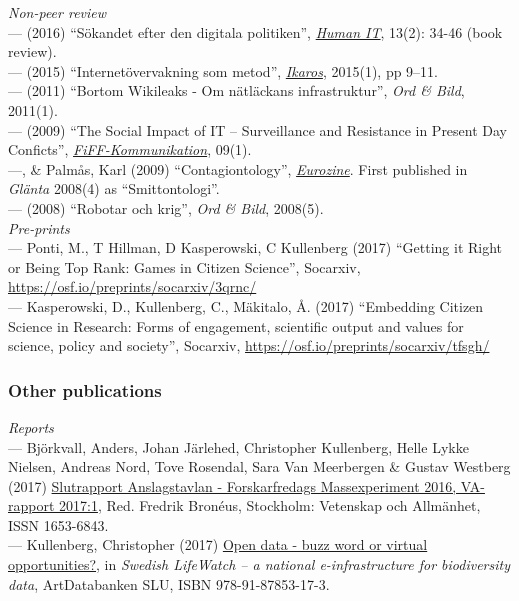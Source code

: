 \documentclass[a4paper,11pt,oneside]{article}
\begin{document}
  \noindent  \emph{Non-peer review} \\
    --- (2016) ``Sökandet efter den digitala politiken'', \href{https://humanit.hb.se/article/view/504/572}{\emph{Human IT}}, 13(2): 34-46 (book review).\\
    --- (2015) ``Internetövervakning som metod'', \href{http://gup.ub.gu.se/records/fulltext/220443/220443.pdf}{\emph{Ikaros}}, 2015(1), pp 9–11.\\
    --- (2011) ``Bortom Wikileaks - Om nätläckans infrastruktur'', \emph{Ord \& Bild}, 2011(1).\\
    --- (2009) ``The Social Impact of IT – Surveillance and Resistance in Present Day Conficts'', \href{http://www.fiff.de/publikationen/fiff-kommunikation/fk-2009/fiff-ko-1-2009/fiko_1_2009_kullenberg.pdf}{\emph{FiFF-Kommunikation}}, 09(1).\\
    ---, \& Palmås, Karl (2009) ``Contagiontology'', \href{http://www.eurozine.com/articles/2009-03-09-kullenberg-en.html}{\emph{Eurozine}}. First published in \emph{Glänta} 2008(4) as ``Smittontologi''.\\
    --- (2008) ``Robotar och krig'', \emph{Ord \& Bild}, 2008(5).\\

   \noindent   \emph{Pre-prints}\\
     --- Ponti, M., T Hillman, D Kasperowski, C Kullenberg (2017) ``Getting it Right or Being Top Rank: Games in Citizen Science'', Socarxiv,
      \href{https://osf.io/preprints/socarxiv/3qrnc/}{https://osf.io/preprints/socarxiv/3qrnc/} \\
     --- Kasperowski, D., Kullenberg, C., Mäkitalo, Å. (2017) ``Embedding Citizen Science in Research: Forms of engagement, scientific output and values for science, policy and society'', Socarxiv,  \href{https://osf.io/preprints/socarxiv/tfsgh/}{https://osf.io/preprints/socarxiv/tfsgh/}\\


\subsubsection{Other publications}

   \noindent \emph{Reports}\\
   --- Björkvall, Anders, Johan Järlehed, Christopher Kullenberg, Helle Lykke Nielsen,
Andreas Nord, Tove Rosendal, Sara Van Meerbergen & Gustav Westberg (2017) \href{https://www.forskarfredag.se/filer/ff2016-anslagstavlan-slutrapport.pdf}{Slutrapport
   Anslagstavlan - Forskarfredags Massexperiment 2016, VA-rapport 2017:1}, Red. Fredrik Bronéus,
   Stockholm: Vetenskap och Allmänhet, ISSN 1653-6843.\\
   --- Kullenberg, Christopher (2017) \href{http://www.slu.se/globalassets/ew/subw/lifewatch/publikationer/slw-summary-report-web-170622.pdf}{Open data - buzz word or virtual opportunities?},
   in \emph{Swedish LifeWatch – a national e-infrastructure for biodiversity data}, ArtDatabanken SLU, ISBN
978-91-87853-17-3.\\
\end{document}
